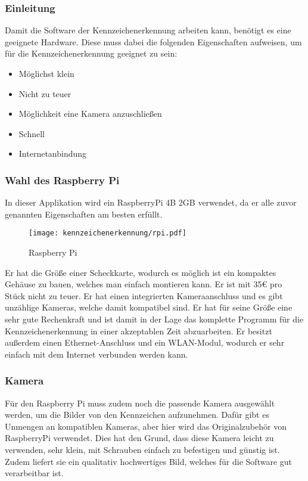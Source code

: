 \subsubsection{Einleitung}
Damit die Software der Kennzeichenerkennung arbeiten kann, benötigt es eine geeignete Hardware. Diese muss dabei die folgenden Eigenschaften 
aufweisen, um für die Kennzeichenerkennung geeignet zu sein:

\begin{itemize}
    \item Möglichst klein
    \item Nicht zu teuer 
    \item Möglichkeit eine Kamera anzuschließen 
    \item Schnell 
    \item Internetanbindung
\end{itemize}

\subsubsection{Wahl des Raspberry Pi}
In dieser Applikation wird ein RaspberryPi 4B 2GB verwendet, da er alle zuvor genannten Eigenschaften am besten erfüllt.\\

\begin{figure}[H]
    \centering
    \texttt{[image: kennzeichenerkennung/rpi.pdf]}
    \caption{Raspberry Pi}
\end{figure}

Er hat die Größe einer Scheckkarte, wodurch es möglich ist ein kompaktes Gehäuse zu bauen, welches man einfach montieren kann. 
Er ist mit 35€ pro Stück nicht zu teuer. Er hat einen integrierten Kameraanschluss und es gibt unzählige Kameras, welche damit 
kompatibel sind. Er hat für seine Größe eine sehr gute Rechenkraft und ist damit in der Lage das komplette Programm für die 
Kennzeichenerkennung in einer akzeptablen Zeit abzuarbeiten. Er besitzt außerdem einen Ethernet-Anschluss und ein WLAN-Modul, 
wodurch er sehr einfach mit dem Internet verbunden werden kann.

\subsubsection{Kamera}
Für den Raspberry Pi muss zudem noch die passende Kamera ausgewählt werden, um die Bilder von den Kennzeichen aufzunehmen. 
Dafür gibt es Unmengen an kompatiblen Kameras, aber hier wird das Originalzubehör von RaspberryPi verwendet. Dies hat den Grund, 
dass diese Kamera leicht zu verwenden, sehr klein, mit Schrauben einfach zu befestigen und günstig ist. Zudem liefert sie ein 
qualitativ hochwertiges Bild, welches für die Software gut verarbeitbar ist.

